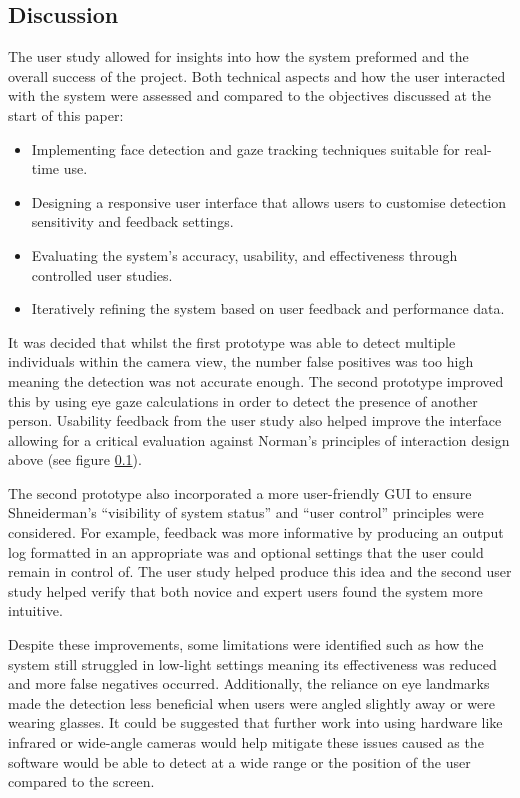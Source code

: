 \documentclass[12pt]{article}
\theoremstyle{plain}
\theoremstyle{definition}
\begin{document}
\subsection{Discussion}

The user study allowed for insights into how the system preformed and the overall success of the project. Both technical aspects and how the user interacted with the system were assessed and compared to the objectives discussed at the start of this paper:

\begin{itemize}
  \item Implementing face detection and gaze tracking techniques suitable for real-time use.
  \item Designing a responsive user interface that allows users to customise detection sensitivity and feedback settings.
  \item Evaluating the system’s accuracy, usability, and effectiveness through controlled user studies.
  \item Iteratively refining the system based on user feedback and performance data.
\end{itemize}

It was decided that whilst the first prototype was able to detect multiple individuals within the camera view, the number false positives was too high meaning the detection was not accurate enough. The second prototype improved this by using eye gaze calculations in order to detect the presence of another person. Usability feedback from the user study also helped improve the interface allowing for a critical evaluation against Norman’s principles of interaction design \cite{} above (see figure \ref{}).

The second prototype also incorporated a more user-friendly GUI to ensure Shneiderman’s “visibility of system status” and “user control” principles \cite{} were considered. For example, feedback was more informative by producing an output log formatted in an appropriate was and optional settings that the user could remain in control of. The user study helped produce this idea and the second user study helped verify that both novice and expert users found the system more intuitive.

Despite these improvements, some limitations were identified such as how the system still struggled in low-light settings meaning its effectiveness was reduced and more false negatives occurred. Additionally, the reliance on eye landmarks made the detection less beneficial when users were angled slightly away or were wearing glasses. It could be suggested that further work into using hardware like infrared or wide-angle cameras would help mitigate these issues caused as the software would be able to detect at a wide range or the position of the user compared to the screen.
\end{document}
